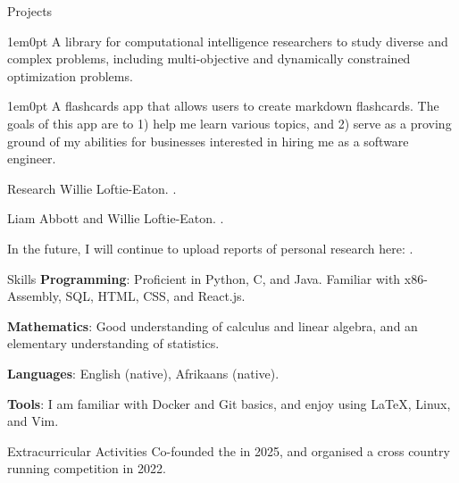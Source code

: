 \documentclass{wle_cv}
\begin{document}
\begin{cvsection}{Projects}
  \noindent{}
  \begin{adjustwidth}{1em}{0pt}
    A library for computational intelligence researchers to study diverse and
    complex problems, including multi-objective and dynamically constrained
    optimization problems.
  \end{adjustwidth}

  \noindent{}
  \begin{adjustwidth}{1em}{0pt}
    A flashcards app that allows users to create markdown flashcards. The goals
    of this app are to 1) help me learn various topics, and 2) serve as a
    proving ground of my abilities for businesses interested in hiring me as a
    software engineer.
  \end{adjustwidth}
\end{cvsection}

\begin{cvsection}{Research}
    Willie Loftie-Eaton.
    .

    \noindent Liam Abbott and Willie Loftie-Eaton.
    .

    \noindent In the future, I will continue to upload reports of personal
    research here:
    .
\end{cvsection}

\begin{cvsection}{Skills}
  \noindent\textbf{Programming}: Proficient in Python, C, and Java. Familiar
  with x86-Assembly, SQL, HTML, CSS, and React.js.

  \noindent\textbf{Mathematics}: Good understanding of calculus and linear
  algebra, and an elementary understanding of statistics.

  \noindent\textbf{Languages}: English (native), Afrikaans (native).

  \noindent\textbf{Tools}: I am familiar with Docker and Git basics, and enjoy
  using \LaTeX, Linux, and Vim.
\end{cvsection}

\begin{cvsection}{Extracurricular Activities}
Co-founded the 
in 2025, and organised a cross country running competition in 2022.
\end{cvsection}
\end{document}
